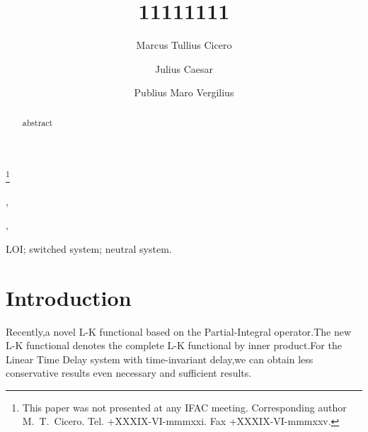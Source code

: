 \documentclass[twocolumn]{autart}    %
\begin{document}
\begin{frontmatter}

\title{11111111} %

\thanks[footnoteinfo]{This paper was not presented at any IFAC 
meeting. Corresponding author M.~T.~Cicero. Tel. +XXXIX-VI-mmmxxi. 
Fax +XXXIX-VI-mmmxxv.}

\author[Paes1tum]{Marcus Tullius Cicero},    %
\author[Rome]{Julius Caesar},               %
\author[Baiae]{Publius Maro Vergilius}  %

\address[Paestum]{Buckingham Palace, Paestum}  %
\address[Rome]{Senate House, Rome}             %
\address[Baiae]{The White House, Baiae}        %

          
\begin{keyword}                           %
LOI; switched system; neutral system.               %
\end{keyword}                             %


\begin{abstract}                          %
abstract
\end{abstract}

\end{frontmatter}

\section{Introduction}

Recently,a novel L-K functional based on the Partial-Integral operator.The new L-K functional denotes the
complete L-K functional by inner product.For the Linear Time Delay system with time-invariant delay,we can 
obtain less conservative results even necessary and sufficient results.
\end{document}
